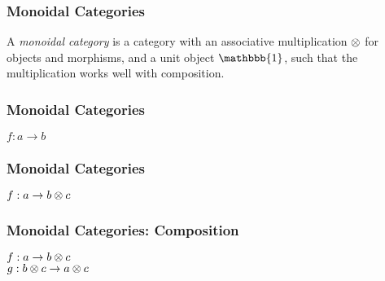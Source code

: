 \begin{frame}
    \frametitle{Monoidal Categories}

    A \textit{monoidal category} is a category with an associative multiplication $\otimes$ for objects and morphisms, and a unit object $\mathbbb{1}$, such that the multiplication works well with composition. \newline

\end{frame}

\begin{frame}
    \frametitle{Monoidal Categories}

    \begin{center}
        $f: a \to b$ \\ \vspace{0.5em}
        
    \end{center}

\end{frame}

\begin{frame}
    \frametitle{Monoidal Categories}

    \begin{center}
        $f: a \to b \otimes c$ \\ \vspace{0.5em}
        
    \end{center}
\end{frame}

\begin{frame}
    \frametitle{Monoidal Categories: Composition}

    \begin{center}
        $f: a \to b \otimes c$ \\
        $g: b \otimes c \to a \otimes c$ \\ \vspace{0.5em}

    \end{center}
\end{frame}


